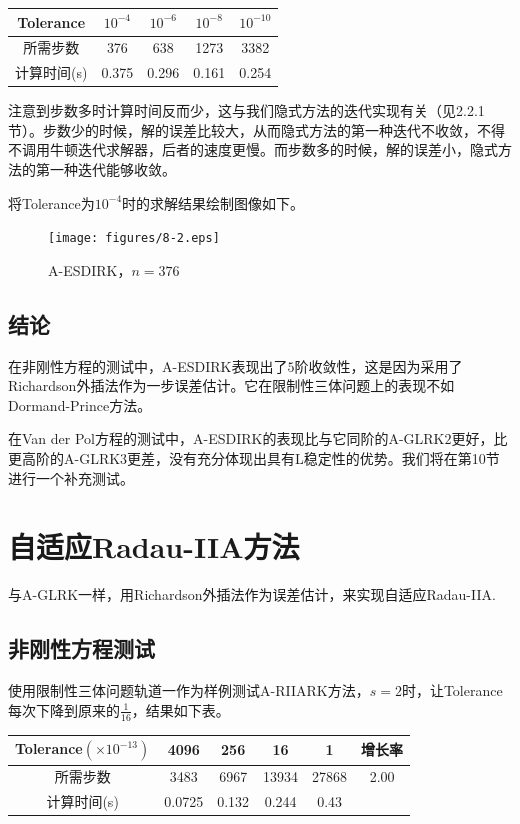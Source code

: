 \documentclass[lang=cn,10pt,bibend=bibtex]{elegantbook}
\begin{document}
\begin{table}[H]
  \centering
  \begin{tabular}{c|cccc}
    Tolerance & $10^{-4}$ & $10^{-6}$ & $10^{-8}$ & $10^{-10}$ \\ \hline
    所需步数 & 376 & 638 & 1273 & 3382   \\
    计算时间(s) & 0.375  & 0.296 & 0.161 & 0.254 
  \end{tabular}
\end{table}

注意到步数多时计算时间反而少，这与我们隐式方法的迭代实现有关（见2.2.1节）。步数少的时候，解的误差比较大，从而隐式方法的第一种迭代不收敛，不得不调用牛顿迭代求解器，后者的速度更慢。而步数多的时候，解的误差小，隐式方法的第一种迭代能够收敛。

将Tolerance为$10^{-4}$时的求解结果绘制图像如下。

\begin{figure}[H]
  \centering
  \texttt{[image: figures/8-2.eps]}
  \caption*{A-ESDIRK，$n=376$}
\end{figure}
\vspace{-1em}

\subsection{结论}

在非刚性方程的测试中，A-ESDIRK表现出了$5$阶收敛性，这是因为采用了Richardson外插法作为一步误差估计。它在限制性三体问题上的表现不如Dormand-Prince方法。

在Van der Pol方程的测试中，A-ESDIRK的表现比与它同阶的A-GLRK$2$更好，比更高阶的A-GLRK$3$更差，没有充分体现出具有L稳定性的优势。我们将在第10节进行一个补充测试。

\section{自适应Radau-IIA方法}

与A-GLRK一样，用Richardson外插法作为误差估计，来实现自适应Radau-IIA.

\subsection{非刚性方程测试}

使用限制性三体问题轨道一作为样例测试A-RIIARK方法，$s=2$时，让Tolerance每次下降到原来的$\frac{1}{16}$，结果如下表。

\vspace{-.5em}
\begin{table}[H]
  \centering
  \begin{tabular}{c|cccc|c}
    Tolerance$(\times 10^{-13})$ & 4096 & 256 & 16 & 1 & 增长率 \\ \hline
    所需步数 & 3483 & 6967  & 13934 & 27868 & 2.00   \\
    计算时间(s) & 0.0725 & 0.132  & 0.244  & 0.43 & 
  \end{tabular}
\end{table}
\vspace{-.5em}
\end{document}
